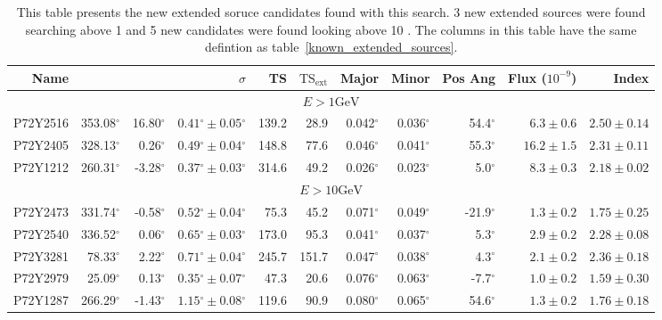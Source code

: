 \documentclass[12pt,preprint]{aastex}
\newcommand{\gev}{\text{GeV}\xspace}
\newcommand{\tsext}{{\ensuremath{\text{TS}_\text{ext}}}\xspace}
\newcommand{\glon}{\text{GLON}\xspace}
\newcommand{\glat}{\text{GLAT}\xspace}
\renewcommand{\deg}{\ensuremath{^\circ}\xspace}
\begin{document}
\clearpage
\begin{table}
  \begin{centering}
    \begin{tabular}{r|rrrrrrrrrr}
      \hline
      \hline
      Name                 &          \glon &          \glat &                    $\sigma$ &       TS &   $\tsext$ &      Major &      Minor &    Pos Ang &      Flux ($10^{-9}$) &                 Index \\
      \hline
      \multicolumn{11}{c}{$E > 1\gev$} \\
      \hline
      P72Y2516             &     353.08\deg &      16.80\deg & $  0.41\deg \pm   0.05\deg$ &    139.2 &       28.9 &  0.042\deg &  0.036\deg &   54.4\deg & $    6.3 \pm     0.6$ & $   2.50 \pm    0.14$ \\
      P72Y2405             &     328.13\deg &       0.26\deg & $  0.49\deg \pm   0.04\deg$ &    148.8 &       77.6 &  0.046\deg &  0.041\deg &   55.3\deg & $   16.2 \pm     1.5$ & $   2.31 \pm    0.11$ \\
      P72Y1212             &     260.31\deg &      -3.28\deg & $  0.37\deg \pm   0.03\deg$ &    314.6 &       49.2 &  0.026\deg &  0.023\deg &    5.0\deg & $    8.3 \pm     0.3$ & $   2.18 \pm    0.02$ \\
      \hline
      \multicolumn{11}{c}{$E > 10\gev$} \\
      \hline
      P72Y2473             &     331.74\deg &      -0.58\deg & $  0.52\deg \pm   0.04\deg$ &     75.3 &       45.2 &  0.071\deg &  0.049\deg &  -21.9\deg & $    1.3 \pm     0.2$ & $   1.75 \pm    0.25$ \\
      P72Y2540             &     336.52\deg &       0.06\deg & $  0.65\deg \pm   0.03\deg$ &    173.0 &       95.3 &  0.041\deg &  0.037\deg &    5.3\deg & $    2.9 \pm     0.2$ & $   2.28 \pm    0.08$ \\
      P72Y3281             &      78.33\deg &       2.22\deg & $  0.71\deg \pm   0.04\deg$ &    245.7 &      151.7 &  0.047\deg &  0.038\deg &    4.3\deg & $    2.1 \pm     0.2$ & $   2.36 \pm    0.18$ \\
      P72Y2979             &      25.09\deg &       0.13\deg & $  0.35\deg \pm   0.07\deg$ &     47.3 &       20.6 &  0.076\deg &  0.063\deg &   -7.7\deg & $    1.0 \pm     0.2$ & $   1.59 \pm    0.30$ \\
      P72Y1287             &     266.29\deg &      -1.43\deg & $  1.15\deg \pm   0.08\deg$ &    119.6 &       90.9 &  0.080\deg &  0.065\deg &   54.6\deg & $    1.3 \pm     0.2$ & $   1.76 \pm    0.18$ \\
      \hline
    \end{tabular}
    \caption{This table presents the new extended soruce candidates found with
    this search. 3 new extended sources were found searching above 1 \gev and
    5 new candidates were found looking above 10 \gev.
    The columns in this table have the same defintion as table~\ref{known_extended_sources}.}
    \label{new_ext_srcs}
  \end{centering}
\end{table}
\end{document}
